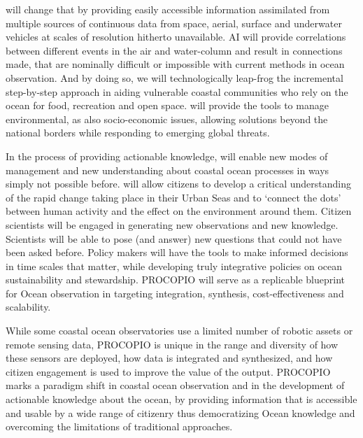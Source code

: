 \documentclass[12pt]{article}
\begin{document}
\pro will change that by providing easily accessible information
assimilated from multiple sources of continuous data from space,
aerial, surface and underwater vehicles at scales of resolution
hitherto unavailable. AI will provide correlations between different
events in the air and water-column and result in connections made,
that are nominally difficult or impossible with current methods in
ocean observation. And by doing so, we will technologically leap-frog
the incremental step-by-step approach in aiding vulnerable coastal
communities who rely on the ocean for food, recreation and open
space. \pro will provide the tools to manage environmental, as also
socio-economic issues, allowing solutions beyond the national borders
while responding to emerging global threats.

In the process of providing actionable knowledge, \pro will enable new
modes of management and new understanding about coastal ocean
processes in ways simply not possible before. \pro will allow citizens
to develop a critical understanding of the rapid change taking place
in their Urban Seas and to ‘connect the dots’ between human activity
and the effect on the environment around them. Citizen scientists will
be engaged in generating new observations and new
knowledge. Scientists will be able to pose (and answer) new questions
that could not have been asked before. Policy makers will have the
tools to make informed decisions in time scales that matter, while
developing truly integrative policies on ocean sustainability and
stewardship. PROCOPIO will serve as a replicable blueprint for Ocean
observation in targeting integration, synthesis, cost-effectiveness
and scalability.

While some coastal ocean observatories use a limited number of robotic
assets or remote sensing data, PROCOPIO is unique in the range and
diversity of how these sensors are deployed, how data is integrated
and synthesized, and how citizen engagement is used to improve the
value of the output. PROCOPIO marks a paradigm shift in coastal ocean
observation and in the development of actionable knowledge about the
ocean, by providing information that is accessible and usable by a
wide range of citizenry thus democratizing Ocean knowledge and
overcoming the limitations of traditional approaches.
\end{document}
